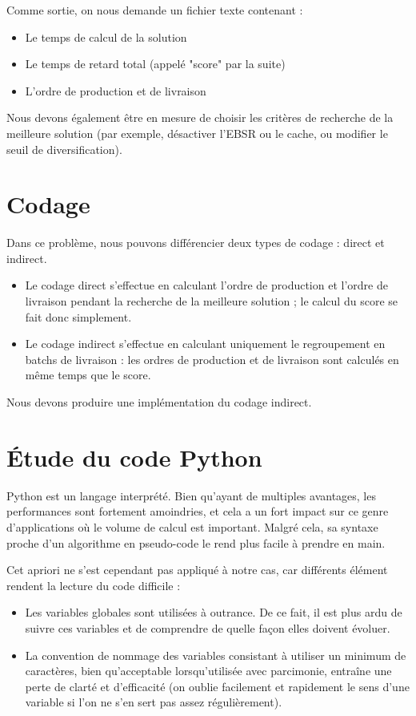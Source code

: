\documentclass[hideweeklyreports]{polytech/polytech}
\begin{document}
			Comme sortie, on nous demande un fichier texte contenant :
			\begin{itemize}
				\item Le temps de calcul de la solution
				\item Le temps de retard total (appelé "score" par la suite)
				\item L'ordre de production et de livraison
			\end{itemize}
			
			Nous devons également être en mesure de choisir les critères de recherche de la meilleure solution (par exemple, désactiver l'EBSR ou le cache, ou modifier le seuil de diversification).
			
		\section{Codage}
			Dans ce problème, nous pouvons différencier deux types de codage : direct et indirect.
			\begin{itemize}
				\item Le codage direct s'effectue en calculant l'ordre de production et l'ordre de livraison pendant la recherche de la meilleure solution ; le calcul du score se fait donc simplement.
				\item Le codage indirect s'effectue en calculant uniquement le regroupement en batchs de livraison : les ordres de production et de livraison sont calculés en même temps que le score.
			\end{itemize}
			
			Nous devons produire une implémentation du codage indirect.
			
		
		\section{Étude du code Python}
			Python est un langage interprété. Bien qu'ayant de multiples avantages, les performances sont fortement amoindries, et cela a un fort impact sur ce genre d'applications où le volume de calcul est important. Malgré cela, sa syntaxe proche d'un algorithme en pseudo-code le rend plus facile à prendre en main.
			
			Cet apriori ne s'est cependant pas appliqué à notre cas, car différents élément rendent la lecture du code difficile :
			\begin{itemize}
				\item Les variables globales sont utilisées à outrance. De ce fait, il est plus ardu de suivre ces variables et de comprendre de quelle façon elles doivent évoluer.
				\item La convention de nommage des variables consistant à utiliser un minimum de caractères, bien qu'acceptable lorsqu'utilisée avec parcimonie, entraîne une perte de clarté et d'efficacité (on oublie facilement et rapidement le sens d'une variable si l'on ne s'en sert pas assez régulièrement).
			\end{itemize}
			
\end{document}
